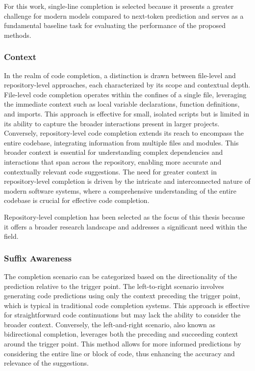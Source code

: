 For this work, single-line completion is selected because it presents a greater challenge for modern models compared to next-token prediction and serves as a fundamental baseline task for evaluating the performance of the proposed methods.

\subsubsection*{Context}

In the realm of code completion, a distinction is drawn between file-level and repository-level approaches, each characterized by its scope and contextual depth. File-level code completion operates within the confines of a single file, leveraging the immediate context such as local variable declarations, function definitions, and imports. This approach is effective for small, isolated scripts but is limited in its ability to capture the broader interactions present in larger projects. Conversely, repository-level code completion extends its reach to encompass the entire codebase, integrating information from multiple files and modules. This broader context is essential for understanding complex dependencies and interactions that span across the repository, enabling more accurate and contextually relevant code suggestions. The need for greater context in repository-level completion is driven by the intricate and interconnected nature of modern software systems, where a comprehensive understanding of the entire codebase is crucial for effective code completion.

Repository-level completion has been selected as the focus of this thesis because it offers a broader research landscape and addresses a significant need within the field.

\subsubsection*{Suffix Awareness}

The completion scenario can be categorized based on the directionality of the prediction relative to the trigger point. The left-to-right scenario involves generating code predictions using only the context preceding the trigger point, which is typical in traditional code completion systems. This approach is effective for straightforward code continuations but may lack the ability to consider the broader context. Conversely, the left-and-right scenario, also known as bidirectional completion, leverages both the preceding and succeeding context around the trigger point. This method allows for more informed predictions by considering the entire line or block of code, thus enhancing the accuracy and relevance of the suggestions.

